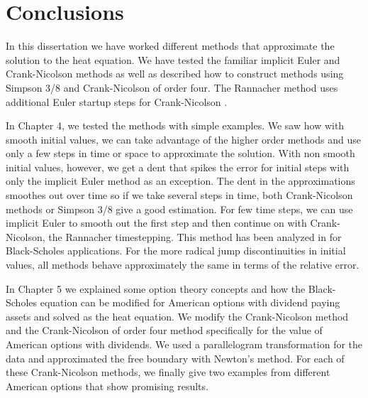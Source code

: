 \documentclass[00main.tex]{subfiles}
\begin{document}
\chapter{Conclusions}


In this dissertation we have worked different methods that approximate the solution to the heat equation. We have tested the familiar implicit Euler and Crank-Nicolson methods as well as described how to construct methods using Simpson 3/8 and Crank-Nicolson of order four. The Rannacher method uses additional Euler startup steps for Crank-Nicolson \cite{rannacher}.  %

In Chapter 4, we tested the methods with simple examples. We saw how with smooth initial values, we can take advantage of the higher order methods and use only a few steps in time or space to approximate the solution. With non smooth initial values, however, we get a dent that spikes the error for initial steps with only the implicit Euler method as an exception. The dent in the approximations smoothes out over time so if we take several steps in time, both Crank-Nicolson methods or Simpson 3/8 give a good estimation. For few time steps, we can use implicit Euler to smooth out the first step and then continue on with Crank-Nicolson, the Rannacher timestepping. This method has been analyzed in \cite{giles} for Black-Scholes applications. For the more radical jump discontinuities in initial values, all methods behave approximately the same in terms of the relative error.

In Chapter 5 we explained some option theory concepts and how the Black-Scholes equation can be modified for American options with dividend paying assets and solved as the heat equation. We modify the Crank-Nicolson method and the Crank-Nicolson of order four method specifically for the value of American options with dividends. We used a parallelogram transformation for the data and approximated the free boundary with Newton's method. For each of these Crank-Nicolson methods, we finally give two examples from different American options that show promising results.

\end{document}
